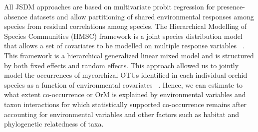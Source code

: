 All JSDM approaches are based on multivariate probit regression for presence-absence datasets and allow partitioning of shared environmental responses among species from residual correlations among species. The Hierarchical Modelling of Species Communities (HMSC) framework is a joint species distribution model that allows a set of covariates to be modelled on multiple response variables ~\citep{ovaskainen2017}. This framework is a hierarchical generalized linear mixed model and is structured by both fixed effects and random effects. This approach allowed us to jointly model the occurrences of mycorrhizal OTUs identified in each individual orchid species as a function of environmental covariates ~\citep{tikhonov2017}. Hence, we can estimate to what extent co-occurrence or OrM is explained by environmental variables and taxon interactions for which statistically supported co-occurrence remains after accounting for environmental variables and other factors such as habitat and phylogenetic relatedness of taxa.

